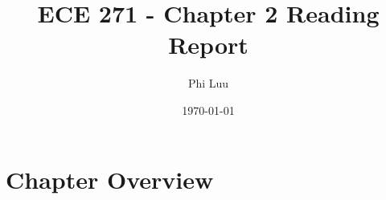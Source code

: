 \documentclass[12pt]{article}
\title{ECE 271 - Chapter 2 Reading Report}
\author{Phi Luu}
\date{\today}
\begin{document}
\maketitle

\section{Chapter Overview}
\end{document}
